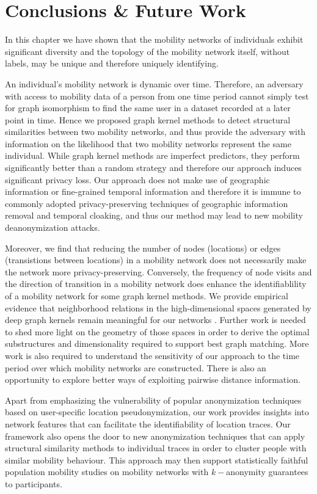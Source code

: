 

\section{Conclusions \& Future Work}

In this chapter we have shown that the mobility networks of individuals exhibit significant diversity and the topology of the mobility network itself, without labels, may be unique and therefore uniquely identifying.

An individual's mobility network is dynamic over time.
Therefore, an adversary with access to mobility data of a person from one time period cannot simply test for graph isomorphism to find the same user in a dataset recorded at a later point in time.
Hence we proposed graph kernel methods to detect structural similarities between two mobility networks, and thus provide the adversary with information on the likelihood that two mobility networks represent the same individual.
While graph kernel methods are imperfect predictors, they perform significantly better than a random strategy and therefore our approach induces significant privacy loss.
Our approach does not make use of geographic information or fine-grained temporal information and therefore it is immune to commonly adopted privacy-preserving techniques of geographic information removal and temporal cloaking, and thus our method may lead to new mobility deanonymization attacks.

Moreover, we find that reducing the number of nodes (locations) or edges (transistions between locations) in a mobility network does not necessarily make the network more privacy-preserving.
Conversely, the frequency of node visits and the direction of transition in a mobility network does enhance the identifiablility of a mobility network for some graph kernel methods.
We provide empirical evidence that neighborhood relations in the high-dimensional spaces generated by deep graph kernels remain meaningful for our networks \cite{Beyer}.
Further work is needed to shed more light on the geometry of those spaces in order to derive the optimal substructures and dimensionality required to support best graph matching.
More work is also required to understand the sensitivity of our approach to the time period over which mobility networks are constructed.
There is also an opportunity to explore better ways of exploiting pairwise distance information.

Apart from emphasizing the vulnerability of popular anonymization techniques based on user-specific location pseudonymization, our work provides insights into network features that can facilitate the identifiability of location traces.
Our framework also opens the door to new anonymization techniques that can apply structural similarity methods to individual traces in order to cluster people with similar mobility behaviour.
This approach may then support statistically faithful population mobility studies on mobility networks with $k-$anonymity guarantees to participants.

